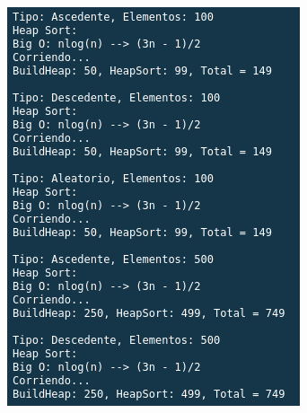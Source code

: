 \documentclass{article}
\begin{document}
			\begin{figure}[H]
				\begin{multicols}{2}
					\includegraphics[width = \linewidth]{images/e3-8}\par

\end{multicols}
\end{figure}
\end{document}
